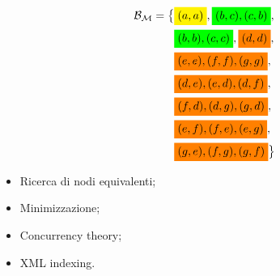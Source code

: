 \documentclass{beamer}
\newcommand{\nodesize}{.7cm}
\begin{document}
\begin{frame}
\begin{figure}
\begin{subfigure}{0.35\textwidth}
        \end{subfigure}
        \begin{subfigure}{0.45\textwidth}
            \scriptsize
            \begin{align*}
                \mathcal{B}_\mathcal{M} = \big\{&\colorbox{yellow}{$(a,a)$}, \colorbox{green}{$(b,c), (c,b)$},\\
                &\colorbox{green}{$(b,b), (c,c)$}, \colorbox{orange}{$(d,d)$},\\
                &\colorbox{orange}{$(e,e), (f,f), (g,g)$},\\
                &\colorbox{orange}{$(d,e), (e,d), (d,f)$},\\
                &\colorbox{orange}{$(f,d), (d,g), (g,d)$},\\
                &\colorbox{orange}{$(e,f), (f,e), (e,g)$},\\
                &\colorbox{orange}{$(g,e), (f,g), (g,f)$}\big\}
            \end{align*}
        \end{subfigure}
        \begin{subfigure}{0.1\textwidth}
        \end{subfigure}
    \end{figure}

    \bigskip

    \begin{multicols}{2}
        \begin{itemize}
            \item Ricerca di nodi equivalenti;
            \item Minimizzazione;
            \item Concurrency theory;
            \item XML indexing.
        \end{itemize}
    \end{multicols}
\end{frame}
\end{document}
